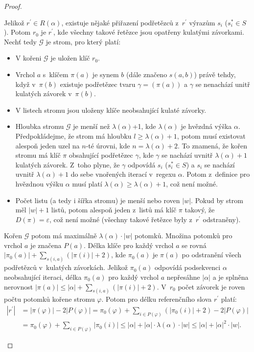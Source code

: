 \documentclass[thesis=B,czech]{FITthesis}[2019/12/23]
\theoremstyle{definition}
\begin{document}
\begin{proof}
\begin{itemize}
{	Jelikož $r^\prime \in R(\alpha)$, existuje nějaké přiřazení podřetězců z~$r^\prime$ výrazům $s_i$ ($s_i^\ast \in S$). Potom $r_0$ je $r^\prime$, kde všechny takové řetězce jsou opatřeny kulatými závorkami. Nechť tedy $\mathcal{G}$ je strom, pro který platí:
	\begin{itemize}  \item{V kořeni $\mathcal{G}$ je uložen klíč $r_0$.}
				\item{Vrchol $a$ s~klíčem $\pi(a)$ je synem $b$ (dále značeno $s(a, b)$) právě tehdy, když v~$\pi(b)$ existuje podřetězec tvaru $\gamma= (\pi(a))$ a $\gamma$ se nenachází unitř kulatých závorek v~$\pi(b)$.}
				\item{V listech stromu jsou uloženy klíče neobsahující kulaté závorky.}
				\item{Hloubka stromu $\mathcal{G}$ je menší než $\lambda(\alpha)$+1, kde $\lambda(\alpha)$ je hvězdná výška $\alpha$. Předpokládejme, že strom má hloubku $l \ge \lambda(\alpha)+1$, potom musí existovat alespoň jeden uzel na $n$-té úrovni, kde $n = \lambda(\alpha)+2$. To znamená, že kořen stromu má klíč $\pi$ obsahující podřetězec $\gamma$, kde $\gamma$ se nachází uvnitř $\lambda(\alpha)+1$ kulatých závorek. Z~toho plyne, že $\gamma$ odpovídá $s_i$ ($s_i^\ast \in S$) a $s_i$ se nachází uvnitř $\lambda(\alpha)+1$ do sebe vnořených iterací v~regexu $\alpha$. Potom z~definice pro hvězdnou výšku $\alpha$ musí platí $\lambda(\alpha) \ge \lambda(\alpha)+1$, což není možné.}
				\item{Počet listu (a tedy i šířka stromu) je menší nebo roven $|w|$. Pokud by strom měl $|w|+1$ listů, potom alespoň jeden z~listů má klíč $\pi$ takový, že $D(\pi)=\varepsilon$, což není možné (všechny takové řetězce byly z~$r^\prime$ odstraněny).}
	\end{itemize}
Kořen $\mathcal{G}$ potom má maximálně $\lambda(\alpha)\cdot|w|$ potomků. Množina potomků pro vrchol $a$ je značena $P(a)$. Délka klíče pro každý vrchol $a$ se rovná $|\pi_{0}(a)| + \sum_{s(i, a)}(|\pi(i)|+2)$, kde $\pi_{0}(a)$ je $\pi(a)$ po odstranění všech podřetězců v~kulatých závorkách. Jelikož $\pi_{0}(a)$ odpovídá podsekvenci $\alpha$ neobsahující iteraci, délka $\pi_{0}(a)$ pro každý vrchol $a$ nepřesáhne $|\alpha|$ a je splněna nerovnost $|\pi(a)| \le |\alpha| + \sum_{s(i, a)}(|\pi(i)|+2)$. V~$r_0$ počet závorek je roven počtu potomků kořene stromu $\varphi$. Potom pro délku referenčního slova $r^\prime$ platí: 
\begin{equation*}\begin{split}|r^{\prime}|&=|\pi(\varphi)|-2|P(\varphi)|=\pi_0(\varphi)+\sum_{i \in P(\varphi)}(|\pi_{0}(i)|+2) - 2|P(\varphi)| \\&= \pi_{0}(\varphi)+\sum_{i \in P(\varphi)}|\pi_{0}(i)| \le |\alpha|+|\alpha|\cdot\lambda(\alpha)\cdot|w| \le |\alpha|+|\alpha|^2\cdot|w|.
\end{split}\end{equation*}
	}
\end{itemize}
\end{proof}
\end{document}
